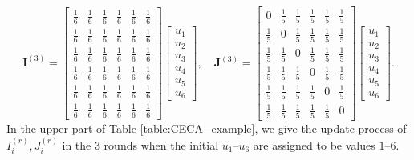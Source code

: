 \documentclass{article}
\newcommand{\vI}{\mathbf{I}}
\newcommand{\vJ}{\mathbf{J}}
\newcommand{\ro}{{(r)}}
\theoremstyle{plain}
\theoremstyle{definition}
\begin{document}
$$
\vI^{(3)}
=
\left[
\begin{array}{cccccc}
    \frac{1}{6} & \frac{1}{6} & \frac{1}{6} & \frac{1}{6} & \frac{1}{6} & \frac{1}{6} \\
    \frac{1}{6} & \frac{1}{6} & \frac{1}{6} & \frac{1}{6} & \frac{1}{6} & \frac{1}{6} \\
    \frac{1}{6} & \frac{1}{6} & \frac{1}{6} & \frac{1}{6} & \frac{1}{6} & \frac{1}{6} \\
    \frac{1}{6} & \frac{1}{6} & \frac{1}{6} & \frac{1}{6} & \frac{1}{6} & \frac{1}{6} \\
    \frac{1}{6} & \frac{1}{6} & \frac{1}{6} & \frac{1}{6} & \frac{1}{6} & \frac{1}{6} \\
    \frac{1}{6} & \frac{1}{6} & \frac{1}{6} & \frac{1}{6} & \frac{1}{6} & \frac{1}{6}
\end{array}
\right]
\left[
\begin{array}{c}
     u_1  \\
     u_2  \\
     u_3  \\
     u_4  \\
     u_5  \\
     u_6
\end{array}
\right],\quad
\vJ^{(3)}
=
\left[
\begin{array}{cccccc}
    0 & \frac{1}{5} & \frac{1}{5} & \frac{1}{5} & \frac{1}{5} & \frac{1}{5} \\
    \frac{1}{5} & 0 & \frac{1}{5} & \frac{1}{5} & \frac{1}{5} & \frac{1}{5} \\
    \frac{1}{5} & \frac{1}{5} & 0 & \frac{1}{5} & \frac{1}{5} & \frac{1}{5} \\
    \frac{1}{5} & \frac{1}{5} & \frac{1}{5} & 0 & \frac{1}{5} & \frac{1}{5} \\
    \frac{1}{5} & \frac{1}{5} & \frac{1}{5} & \frac{1}{5} & 0 & \frac{1}{5} \\
    \frac{1}{5} & \frac{1}{5} & \frac{1}{5} & \frac{1}{5} & \frac{1}{5} & 0
\end{array}
\right]
\left[
\begin{array}{c}
     u_1  \\
     u_2  \\
     u_3  \\
     u_4  \\
     u_5  \\
     u_6
\end{array}
\right].
$$
\endgroup
{In the upper part of Table \ref{table:CECA_example}, we give the update process of $I_i^\ro,J_i^\ro$ in the 3 rounds when the initial $u_1$--$u_6$ are assigned to be values $1$--$6$.}
\end{document}
